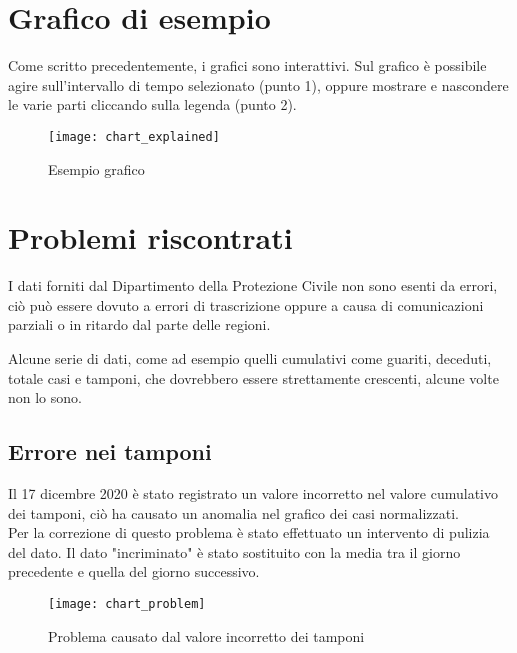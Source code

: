 \section{Grafico di esempio}
Come scritto precedentemente, i grafici sono interattivi.
Sul grafico è possibile agire sull'intervallo di tempo selezionato (punto 1), oppure mostrare e nascondere le varie parti cliccando sulla legenda (punto 2).
\begin{figure}[htp]
    \centering
    \texttt{[image: chart\_explained]}
    \caption{Esempio grafico}
\end{figure}

\section{Problemi riscontrati}
I dati forniti dal Dipartimento della Protezione Civile non sono esenti da errori, ciò può essere dovuto a errori di trascrizione oppure a causa di comunicazioni parziali o in ritardo dal parte delle regioni.

\noindent Alcune serie di dati, come ad esempio quelli cumulativi come guariti, deceduti, totale casi e tamponi, che dovrebbero essere strettamente crescenti, alcune volte non lo sono.

\subsection{Errore nei tamponi}
Il 17 dicembre 2020 è stato registrato un valore incorretto nel valore cumulativo dei tamponi, ciò ha causato un anomalia nel grafico dei casi normalizzati.\\
Per la correzione di questo problema è stato effettuato un intervento di pulizia del dato.
Il dato "incriminato" è stato sostituito con la media tra il giorno precedente e quella del giorno successivo.
\begin{figure}[htp]
    \centering
    \texttt{[image: chart\_problem]}
    \caption{Problema causato dal valore incorretto dei tamponi}
\end{figure}


